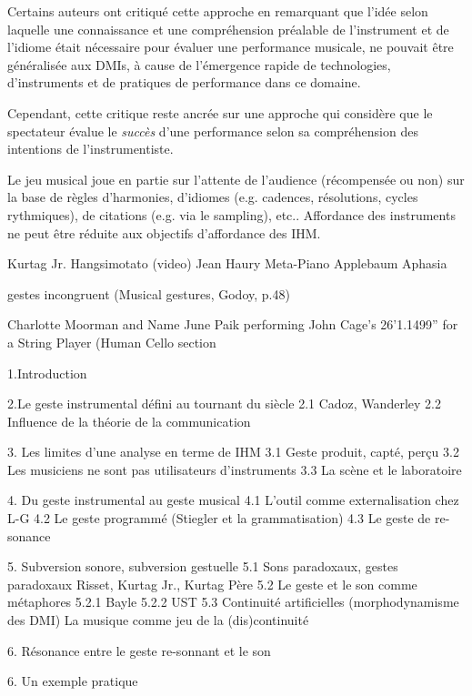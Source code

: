 Certains auteurs ont critiqué cette approche \cite{fyans_where_2009} en remarquant que l'idée selon laquelle une connaissance et une compréhension préalable de l'instrument et de l'idiome était nécessaire pour évaluer une performance musicale, ne pouvait être généralisée aux \glspl{DMI}, à cause de l'émergence rapide de technologies, d'instruments et de pratiques de performance dans ce domaine. 

Cependant, cette critique reste ancrée sur une approche qui considère que le spectateur évalue le \textit{succès} d'une performance selon sa compréhension des intentions de l'instrumentiste.


Le jeu musical joue en partie sur l’attente de l’audience (récompensée ou non) sur la base de règles d'harmonies, d’idiomes (e.g. cadences, résolutions, cycles rythmiques), de citations (e.g. via le sampling), etc..
Affordance des instruments ne peut être réduite aux objectifs d’affordance des IHM.


Kurtag Jr. Hangsimotato (video)
Jean Haury Meta-Piano
Applebaum Aphasia

gestes incongruent (Musical gestures, Godoy, p.48)


Charlotte Moorman and Name June Paik performing John Cage’s 26’1.1499” for a String Player (Human Cello section





1.Introduction

2.Le geste instrumental défini au tournant du siècle
	2.1 Cadoz, Wanderley
	2.2 Influence de la théorie de la communication

3. Les limites d'une analyse en terme de IHM
	3.1 Geste produit, capté, perçu
	3.2 Les musiciens ne sont pas utilisateurs d'instruments
	3.3 La scène et le laboratoire

4. Du geste instrumental au geste musical
	4.1 L'outil comme externalisation chez L-G
	4.2 Le geste programmé (Stiegler et la grammatisation)
	4.3 Le geste de re-sonance

5. Subversion sonore, subversion gestuelle
	5.1 Sons paradoxaux, gestes paradoxaux
		Risset, Kurtag Jr., Kurtag Père
	5.2 Le geste et le son comme métaphores
		5.2.1 Bayle
		5.2.2 UST
	5.3 Continuité artificielles (morphodynamisme des DMI)
		La musique comme jeu de la (dis)continuité

6. Résonance entre le geste re-sonnant et le son

6. Un exemple pratique 



